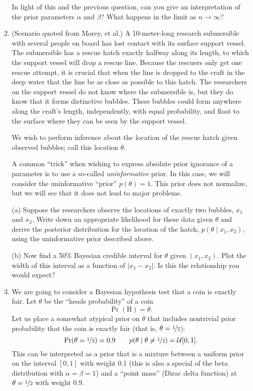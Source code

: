 \documentclass{article}
\newcommand{\given}{\mid}
\newcommand{\mc}[1]{\mathcal{#1}}
\begin{document}
\begin{enumerate}
  In light of this and the previous question, can you give an
  interpretation of the prior parameters $\alpha$ and $\beta$?
  What happens in the limit as $n \to \infty$?

\item
  (Scenario quoted from Morey, et al.)  A 10-meter-long research
  submersible with several people on board has lost contact with its
  surface support vessel. The submersible has a rescue hatch exactly
  halfway along its length, to which the support vessel will drop a
  rescue line. Because the rescuers only get one rescue attempt, it is
  crucial that when the line is dropped to the craft in the deep water
  that the line be as close as possible to this hatch. The researchers
  on the support vessel do not know where the submersible is, but they
  do know that it forms distinctive bubbles. These bubbles could form
  anywhere along the craft's length, independently, with equal
  probability, and float to the surface where they can be seen by the
  support vessel.

  We wish to perform inference about the location of the rescue
  hatch given observed bubbles; call this location $\theta$.

  A common ``trick'' when wishing to express absolute prior ignorance
  of a parameter is to use a so-called \emph{uninformative} prior. In
  this case, we will consider the uninformative ``prior'' $p(\theta) =
  1$. This prior does not normalize, but we will see that it does not
  lead to major problems.

  (a) Suppose the researchers observe the locations of exactly two
  bubbles, $x_1$ and $x_2$. Write down an appropriate likelihood for
  these data given $\theta$ and derive the posterior distribution for
  the location of the hatch, $p(\theta \given x_1, x_2)$, using the
  uninformative prior described above.

  (b) Now find a 50\% Bayesian credible interval for $\theta$ given
  $(x_1, x_2)$. Plot the width of this interval as a function of
  $\lvert x_1 - x_2 \rvert$. Is this the relationship you would
  expect?

\item

  We are going to consider a Bayesian hypothesis test that a coin is
  exactly fair. Let $\theta$ be the ``heads probability'' of a coin
  \[
    \Pr(\text{H}) = \theta.
  \]
  Let us place a somewhat atypical prior on $\theta$ that includes
  nontrivial prior probability that the coin is exactly fair (that is,
  $\theta = \nicefrac{1}{2}$):
  \[
    \Pr(\theta = \nicefrac{1}{2}) = 0.9
    \qquad
    p(\theta \given \theta \neq \nicefrac{1}{2}) = \mc{U}[0, 1].
  \]
  This can be interpreted as a prior that is a mixture between a uniform
  prior on the interval $[0, 1]$ with weight 0.1 (this is also a special
  of the beta distribution with $\alpha = \beta = 1$) and a ``point
  mass'' (Dirac delta function) at $\theta = \nicefrac{1}{2}$ with
  weight 0.9.


\end{enumerate}
\end{document}
